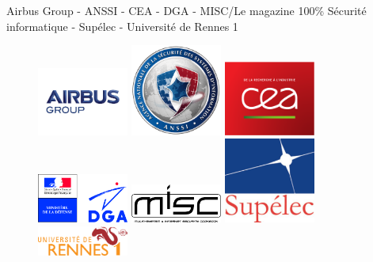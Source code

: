 \begin{center}
Airbus Group - ANSSI -  CEA - DGA - MISC/Le magazine 100\% S\'ecurit\'e informatique - Sup\'elec - Universit\'e de Rennes 1
\end{center}

\begin{figure}[h]
\begin{center}
\parbox{3cm}{\includegraphics[width=3cm]{_images/airbus}}
\hfill
\parbox{3cm}{\includegraphics[width=3cm]{_images/anssi}}
\hfill
\parbox{3cm}{\includegraphics[width=3cm]{_images/cea}}
\end{center}
\vfill
\begin{center}
\parbox{3cm}{\includegraphics[width=3cm]{_images/dga}}
\hfill
\parbox{3cm}{\includegraphics[width=3cm]{_images/misc}}
\hfill
\parbox{3cm}{\includegraphics[width=3cm]{_images/supelec}}
\end{center}
\vfill
\begin{center}
\parbox{3cm}{\includegraphics[width=3cm]{_images/uni-rennes1}}
\end{center}
\end{figure}

